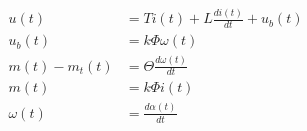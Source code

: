 \begin{align*} 
u(t) &= Ti(t) + L\frac{di(t)}{dt} + u_b(t) \\ 
u_b(t) &= k\Phi{}\omega{}(t) \\
m(t) - m_t(t) &= \Theta{}\frac{d\omega{}(t)}{dt} \\
m(t) &= k\Phi{}i(t) \\
\omega{}(t) &= \frac{d\alpha(t)}{dt}
\end{align*}